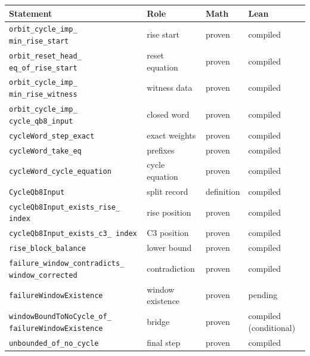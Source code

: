 \begin{center}
\scriptsize
\begin{tabular}{@{}p{}p{}p{}p{}@{}}
\toprule
Statement & Role & Math & Lean \\
\midrule
\texttt{orbit\_\allowbreak cycle\_\allowbreak imp\_\allowbreak
min\_\allowbreak rise\_\allowbreak start} & rise start & proven &
  compiled \\
\texttt{orbit\_\allowbreak reset\_\allowbreak head\_\allowbreak
eq\_\allowbreak of\_\allowbreak rise\_\allowbreak start} & reset
  equation & proven & compiled \\
\texttt{orbit\_\allowbreak cycle\_\allowbreak imp\_\allowbreak
min\_\allowbreak rise\_\allowbreak witness} & witness data & proven &
  compiled \\
\texttt{orbit\_\allowbreak cycle\_\allowbreak imp\_\allowbreak
cycle\_\allowbreak qb8\_\allowbreak input} & closed word & proven &
  compiled \\
\texttt{cycleWord\_\allowbreak step\_\allowbreak exact} & exact
  weights & proven & compiled \\
\texttt{cycleWord\_\allowbreak take\_\allowbreak eq} & prefixes &
  proven & compiled \\
\texttt{cycleWord\_\allowbreak cycle\_\allowbreak equation} & cycle
  equation & proven & compiled \\
\texttt{CycleQb8Input} & split record & definition & compiled \\
\texttt{cycleQb8Input\_\allowbreak exists\_\allowbreak rise\_\allowbreak
index} & rise position & proven & compiled \\
\texttt{cycleQb8Input\_\allowbreak exists\_\allowbreak c3\_\allowbreak
index} & C3 position & proven & compiled \\
\texttt{rise\_\allowbreak block\_\allowbreak balance} & lower bound &
  proven & compiled \\
\texttt{failure\_\allowbreak window\_\allowbreak contradicts\_\allowbreak
window\_\allowbreak corrected} & contradiction & proven & compiled \\
\texttt{failureWindowExistence} & window existence & proven & pending \\
\texttt{windowBoundToNoCycle\_\allowbreak of\_\allowbreak
failureWindowExistence} & bridge & proven & compiled (conditional) \\
\texttt{unbounded\_\allowbreak of\_\allowbreak no\_\allowbreak cycle} &
  final step & proven & compiled \\
\bottomrule
\end{tabular}
\end{center}

